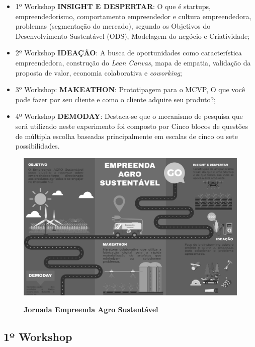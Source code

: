\begin{itemize}

\item {1º Workshop \textbf{INSIGHT E DESPERTAR}: O que é startups, empreendedorismo, comportamento empreendedor e cultura empreendedora, problemas (segmentação do mercado), segundo os Objetivos do Desenvolvimento Sustentável (ODS), Modelagem do negócio e Criatividade;}
\item {2º Workshop \textbf{IDEAÇÃO}: A busca de oportunidades como característica empreendedora, construção do \textit{Lean Canvas}, mapa de empatia, validação da proposta de valor, economia colaborativa e \textit{coworking};}

\item {3º Workshop: \textbf{MAKEATHON}: Prototipagem para o MCVP, O que você pode fazer por seu cliente e como o cliente adquire seu produto?;}

\item {4º Workshop \textbf{DEMODAY}: Destaca-se que o mecanismo de pesquisa que será utilizado neste experimento foi composto por Cinco blocos de questões de múltipla escolha baseadas principalmente em escalas de cinco ou sete possibilidades.}
\end{itemize}

\begin{figure}[!htb]
\centering
\caption{\textbf{Jornada Empreenda Agro Sustentável}}
\includegraphics[scale=0.3]{Imagens/jornada.png}
\label{figura_17}
\end{figure}





\subsection{1º Workshop}

